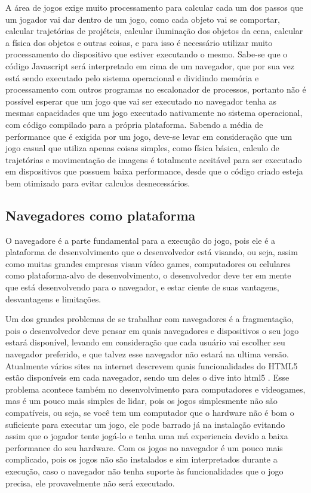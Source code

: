 A área de jogos exige muito processamento para calcular
cada um dos passos que um jogador vai dar dentro de um jogo, como cada
objeto vai se comportar, calcular trajetórias de projéteis, calcular
iluminação dos objetos da cena, calcular a física dos objetos e outras
coisas, e para isso é necessário utilizar muito processamento do
dispositivo que estiver executando o mesmo.
Sabe-se que o código Javascript será interpretado em cima de um navegador, que por sua vez está sendo
executado pelo sistema operacional e dividindo memória e processamento
com outros programas no escalonador de processos, portanto não
é possível esperar que um jogo que vai ser executado no navegador tenha as mesmas
capacidades que um jogo executado nativamente no sistema
operacional, com código compilado para a própria plataforma.
Sabendo a média de performance que é exigida por um jogo,
deve-se levar em consideração que um jogo casual que utiliza apenas
coisas simples, como física básica, calculo de trajetórias e
movimentação de imagens é totalmente aceitável para ser executado em
dispositivos que possuem baixa performance, desde que o código criado
esteja bem otimizado para evitar calculos desnecessários.

\subsection{Navegadores como plataforma}

O navegadore é a parte fundamental para a execução do jogo, pois
ele é a plataforma de desenvolvimento que o desenvolvedor está visando,
ou seja, assim como muitas grandes empresas visam vídeo games,
computadores ou celulares como plataforma-alvo de desenvolvimento, o
desenvolvedor deve ter em mente que está desenvolvendo para o
navegador, e estar ciente de suas vantagens, desvantagens e
limitações.

Um dos grandes problemas de se trabalhar com navegadores é a
fragmentação, pois o desenvolvedor deve pensar em quais navegadores e
dispositivos o seu jogo estará disponível, levando em consideração
que cada usuário vai escolher seu navegador preferido, e que talvez
esse navegador não estará na ultima versão. Atualmente vários sites na
internet descrevem quais funcionalidades do HTML5 estão disponíveis em
cada navegador, sendo um deles o dive into html5 \cite{website:diveintohtml5}.
Esse problema acontece também no desenvolvimento para computadores e
videogames, mas é um pouco mais simples de lidar, pois os jogos
simplesmente não são compatíveis, ou seja, se você tem um computador
que o hardware não é bom o suficiente para executar um jogo, ele pode
barrado já na instalação evitando assim que o jogador tente jogá-lo e
tenha uma má experiencia devido a baixa performance do seu hardware.
Com os jogos no navegador é um pouco mais complicado, pois os jogos
não são instalados e sim interpretados durante a execução, caso o navegador não tenha suporte às funcionalidades que o
jogo precisa, ele provavelmente não será executado.

